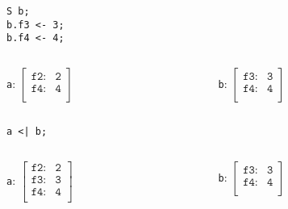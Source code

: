\documentclass[11pt]{beamer}
\begin{document}
\begin{frame}[fragile]
\begin{lstlisting}[language=lekta]
S b;
b.f3 <- 3;
b.f4 <- 4;
\end{lstlisting}
\small
\vspace{-10pt}
\begin{columns}
	\begin{column}{0.5\textwidth}
		\begin{center}
			\texttt{a}: $\begin{bmatrix}
																				\texttt{f2:}      & \texttt{2}\\ 
																				\texttt{f4:}     	& \texttt{4}\\ 
																			\end{bmatrix}$
		\end{center}
	\end{column}
	\begin{column}{0.5\textwidth}
		\begin{center}
			\texttt{b}: $\begin{bmatrix}
																				\texttt{f3:}      & \texttt{3}\\ 
																				\texttt{f4:}     	& \texttt{4}\\ 
																			\end{bmatrix}$
		\end{center}
	\end{column}
\end{columns}
\begin{center}
\texttt{a <| b;}
\end{center}
\vspace{-30pt}
\begin{columns}
	\begin{column}{0.5\textwidth}
		\begin{center}
			\texttt{a}: $\begin{bmatrix}
																				\texttt{f2:}      & \texttt{2}\\ 
																				\texttt{f3:}      & \texttt{3}\\ 
																				\texttt{f4:}     	& \texttt{4}\\ 
																			\end{bmatrix}$
		\end{center}
	\end{column}
	\begin{column}{0.5\textwidth}
		\begin{center}
			\texttt{b}: $\begin{bmatrix}
																				\texttt{f3:}      & \texttt{3}\\ 
																				\texttt{f4:}     	& \texttt{4}\\ 
																			\end{bmatrix}$
		\end{center}
	\end{column}
\end{columns}
\end{frame}
\end{document}
